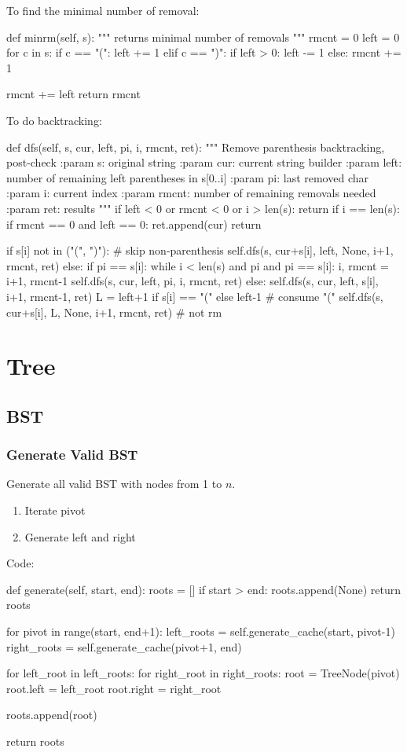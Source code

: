 To find the minimal number of removal:
\begin{python}
def minrm(self, s):
    """
    returns minimal number of removals
    """
    rmcnt = 0
    left = 0
    for c in s:
        if c == "(":
            left += 1
        elif c == ")":
            if left > 0:
                left -= 1
            else:
                rmcnt += 1

    rmcnt += left
    return rmcnt
\end{python}
To do backtracking: 
\begin{python}
def dfs(self, s, cur, left, pi, i, rmcnt, ret):
  """
  Remove parenthesis
  backtracking, post-check
  :param s: original string
  :param cur: current string builder
  :param left: number of remaining left parentheses in s[0..i]
  :param pi: last removed char
  :param i: current index
  :param rmcnt: number of remaining removals needed
  :param ret: results
  """
  if left < 0 or rmcnt < 0 or i > len(s):
    return
  if i == len(s):
    if rmcnt == 0 and left == 0:
      ret.append(cur)
    return

  if s[i] not in ("(", ")"):  # skip non-parenthesis
    self.dfs(s, cur+s[i], left, None, i+1, rmcnt, ret)
  else:
    if pi == s[i]:
      while i < len(s) and pi and pi == s[i]: 
        i, rmcnt = i+1, rmcnt-1
      self.dfs(s, cur, left, pi, i, rmcnt, ret)
    else:
      self.dfs(s, cur, left, s[i], i+1, rmcnt-1, ret)
      L = left+1 if s[i] == "(" else left-1  # consume "("
      self.dfs(s, cur+s[i], L, None, i+1, rmcnt, ret)  # not rm
\end{python}
\section{Tree}
\subsection{BST}
\subsubsection{Generate Valid BST}
Generate all valid BST with nodes from 1 to $n$.
\begin{enumerate}
\item Iterate pivot
\item Generate left and right
\end{enumerate}
Code:
\begin{python}
def generate(self, start, end):
  roots = []
  if start > end:
    roots.append(None)
    return roots

  for pivot in range(start, end+1):
    left_roots = self.generate_cache(start, pivot-1)
    right_roots = self.generate_cache(pivot+1, end)
    
    for left_root in left_roots:
      for right_root in right_roots:
        root = TreeNode(pivot)
        root.left = left_root
        root.right = right_root

        roots.append(root)

  return roots 

\end{python}


